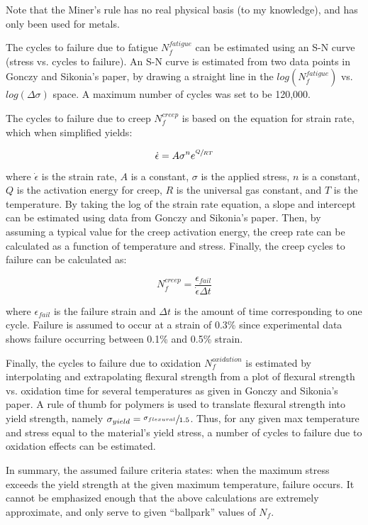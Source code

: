 \documentclass{article}
\begin{document}
Note that the Miner's rule has no real physical basis (to my knowledge), and has only been used for metals.

The cycles to failure due to fatigue $N_f^{fatigue}$ can be estimated using an S-N curve (stress vs. cycles to failure). An S-N curve is estimated from two data points in Gonczy and Sikonia's paper, by drawing a straight line in the $log \left( N_f^{fatigue} \right)$ vs. $log \left( \Delta \sigma \right)$ space. A maximum number of cycles was set to be 120,000.

The cycles to failure due to creep $N_f^{creep}$ is based on the equation for strain rate, which when simplified yields:

\begin{equation}
  \dot{\epsilon} = A \sigma^n e^{\sfrac{Q}{R T}}
\end{equation}

where $\dot{\epsilon}$ is the strain rate, $A$ is a constant, $\sigma$ is the applied stress, $n$ is a constant, $Q$ is the activation energy for creep, $R$ is the universal gas constant, and $T$ is the temperature. By taking the log of the strain rate equation, a slope and intercept can be estimated using data from Gonczy and Sikonia's paper. Then, by assuming a typical value for the creep activation energy, the creep rate can be calculated as a function of temperature and stress. Finally, the creep cycles to failure can be calculated as:

\begin{equation}
  N_f^{creep} = \frac{\epsilon_{fail}}{\dot{\epsilon} \Delta t}
\end{equation}

where $\epsilon_{fail}$ is the failure strain and $\Delta t$ is the amount of time corresponding to one cycle. Failure is assumed to occur at a strain of 0.3\% since experimental data shows failure occurring between 0.1\% and 0.5\% strain.

Finally, the cycles to failure due to oxidation $N_f^{oxidation}$ is estimated by interpolating and extrapolating flexural strength from a plot of flexural strength vs. oxidation time for several temperatures as given in Gonczy and Sikonia's paper. A rule of thumb for polymers is used to translate flexural strength into yield strength, namely $\sigma_{yield} = \sfrac{\sigma_{flexural}}{1.5}$. Thus, for any given max temperature and stress equal to the material's yield stress, a number of cycles to failure due to oxidation effects can be estimated.

In summary, the assumed failure criteria states: when the maximum stress exceeds the yield strength at the given maximum temperature, failure occurs. It cannot be emphasized enough that the above calculations are extremely approximate, and only serve to given ``ballpark'' values of $N_f$.
\end{document}
